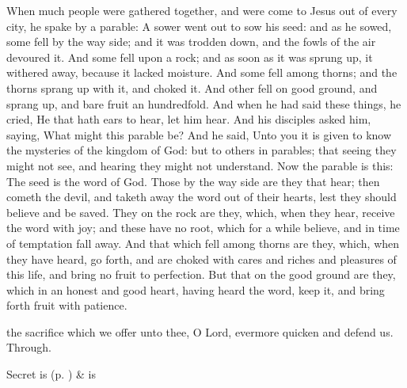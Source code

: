 
 When much people were gathered together, and were come to Jesus out of every city, he spake by a parable: A sower went out to sow his seed: and as he sowed, some fell by the way side; and it was trodden down, and the fowls of the air devoured it. And some fell upon a rock; and as soon as it was sprung up, it withered away, because it lacked moisture. And some fell among thorns; and the thorns sprang up with it, and choked it. And other fell on good ground, and sprang up, and bare fruit an hundredfold. And when he had said these things, he cried, He that hath ears to hear, let him hear. And his disciples asked him, saying, What might this parable be? And he said, Unto you it is given to know the mysteries of the kingdom of God: but to others in parables; that seeing they might not see, and hearing they might not understand. Now the parable is this: The seed is the word of God. Those by the way side are they that hear; then cometh the devil, and taketh away the word out of their hearts, lest they should believe and be saved. They on the rock are they, which, when they hear, receive the word with joy; and these have no root, which for a while believe, and in time of temptation fall away. And that which fell among thorns are they, which, when they have heard, go forth, and are choked with cares and riches and pleasures of this life, and bring no fruit to perfection. But that on the good ground are they, which in an honest and good heart, having heard the word, keep it, and bring forth fruit with patience.

\secret
{} the sacrifice which we offer unto thee, O Lord, evermore quicken and defend us. Through.


\begin{rubric}
     Secret is  (p. \pageref{SPSaints}) \&  is 
\end{rubric}

